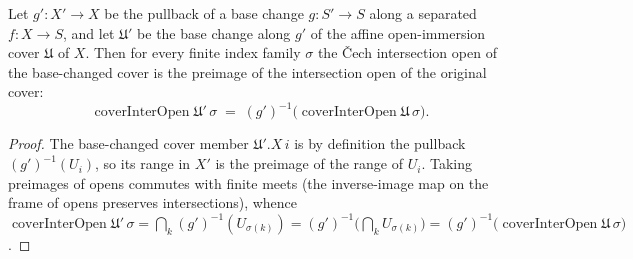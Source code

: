 \begin{lemma}\label{mk-lem:coverinteropen_basechange_eq}
  \leanok

  Let \(g' : X' \to X\) be the pullback of a base change \(g : S' \to S\) along a separated
  \(f : X \to S\), and let \(\mathfrak{U}'\) be the base change along \(g'\) of the affine
  open-immersion cover \(\mathfrak{U}\) of \(X\). Then for every finite index family
  \(\sigma\) the {\v C}ech intersection open of the base-changed cover is the preimage of the
  intersection open of the original cover:
  \[
    \operatorname{coverInterOpen}\mathfrak{U}'\,\sigma
      \;=\; (g')^{-1}\bigl(\operatorname{coverInterOpen}\mathfrak{U}\,\sigma\bigr).
  \]
\end{lemma}
\begin{proof}
  The base-changed cover member \(\mathfrak{U}'.X\,i\) is by definition the pullback
  \((g')^{-1}(U_i)\), so its range in \(X'\) is the preimage of the range of \(U_i\). Taking
  preimages of opens commutes with finite meets (the inverse-image map on the frame of opens
  preserves intersections), whence
  \(\operatorname{coverInterOpen}\mathfrak{U}'\,\sigma = \bigcap_k (g')^{-1}(U_{\sigma(k)})
  = (g')^{-1}\bigl(\bigcap_k U_{\sigma(k)}\bigr)
  = (g')^{-1}\bigl(\operatorname{coverInterOpen}\mathfrak{U}\,\sigma\bigr)\).
\end{proof}

